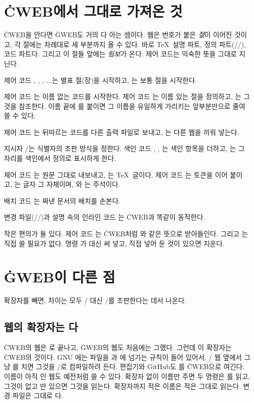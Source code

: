\chapter{\.{CWEB}에서 그대로 가져온 것}
\noindent
\.{CWEB}을 안다면 \.{GWEB}도 거의 다 아는 셈이다. 웹은 번호가 붙은
{\it 절\/}이 이어진 것이고, 각 절에는 차례대로 세 부분까지 올 수 있다. 바로
\TeX\ 설명 파트, 정의 파트(//), 코드 파트다. 그리고 이
절들 앞에는 {\it 림보\/}가 온다. 제어 코드는 익숙한 뜻을 그대로 지닌다.

\bull 제어 코드 , , , $\ldots$는 별표 절(장)을 시작하고, 는
보통 절을 시작한다.

\bull 제어 코드 는 이름 없는 코드를 시작한다. 제어 코드 는 이름 있는 절을
정의하고, 는 그것을 참조한다. 이름 끝에 를 붙이면 그
이름을 유일하게 가리키는 앞부분만으로 줄여 쓸 수 있다.

\bull 제어 코드 는 뒤따르는 코드를 다른 출력 파일로 보내고, 는
다른 웹을 끼워 넣는다.

\bull 지시자 /는 식별자의 조판 방식을 정한다. 색인 코드 ,
, 는 색인 항목을 더하고, 는 그 자리를
색인에서 정의로 표시하게 한다.

\bull 제어 코드 는 원문 그대로 내보내고, 는 \TeX\ 글이다.
제어 코드 는 토큰을 이어 붙이고, 는 글자  그 자체이며,
와 는 주석이다.

\bull 배치 코드    는 짜낸 문서의 배치를 손본다.

\bull 변경 파일(//)과 설명 속의 인라인 코드 는
\.{CWEB}과 똑같이 동작한다.

\noindent 작은 편의가 둘 있다. 제어 코드 는 \.{CWEB}처럼 와 같은
뜻으로 받아들인다. 그리고 는 직접 쓸 필요가 없다.
명령 가 대신 써 넣고, 직접 넣어 둔 것이 있으면 지운다.

\chapter{\.{GWEB}이 다른 점}
\noindent 확장자를 빼면, 차이는 모두 \CEE/ 대신 \GO/를 조판한다는 데서 나온다.

\section{웹의 확장자는 다}
\.{CWEB}의 웹은 로 끝나고, \.{GWEB}의 웹도 처음에는 그랬다. 그런데 이
확장자는 \.{CWEB}의 것이다. GNU 에는  파일을 과
에 넘기는 규칙이 들어 있어서, \GO/ 웹  옆에서 그냥
를 치면 그것을 \CEE/로 컴파일하려 든다. 편집기와 GitHub도 를
\.{CWEB}으로 여긴다. 이름이 아직 인 웹도 예전처럼 쓸 수 있다. 확장자
없이 이름만 주면 두 명령은 를 읽고, 그것이 없고 만 있으면
그것을 읽는다. 확장자까지 적은 이름은 적은 그대로 읽는다. 변경 파일은 그대로
다.

